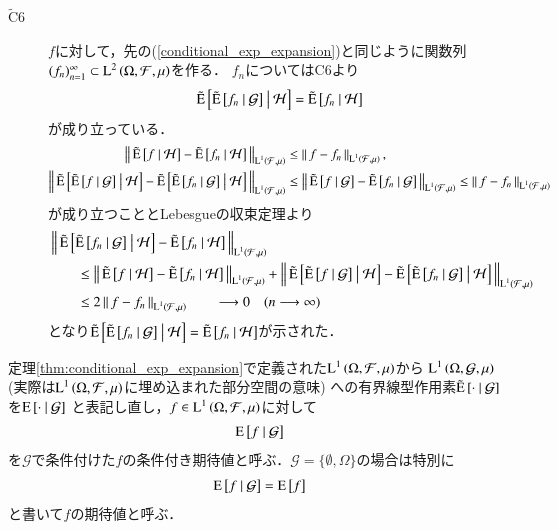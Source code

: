 \begin{prf}
\begin{description}
			\item[$\tilde{\mathrm{C}}$6]
				$f$に対して，先の(\ref{conditional_exp_expansion})と同じように関数列$(f_n)_{n=1}^{\infty} \subset \Lp{2}{\Omega,\mathcal{F},\mu}$を作る．
				$f_n$についてはC6より
				\begin{align}
					\tcexp{\tcexp{f_n}{\mathcal{G}}}{\mathcal{H}} = \tcexp{f_n}{\mathcal{H}}
				\end{align}
				が成り立っている．
				\begin{align}
					\Norm{ \tcexp{f}{\mathcal{H}} -  \tcexp{f_n}{\mathcal{H}}}{\Lp{1}{\mathcal{F},\mu}}
					&\leq \Norm{f -  f_n}{\Lp{1}{\mathcal{F},\mu}}, \\
					\Norm{ \tcexp{\tcexp{f}{\mathcal{G}}}{\mathcal{H}} -  \tcexp{\tcexp{f_n}{\mathcal{G}}}{\mathcal{H}}}{\Lp{1}{\mathcal{F},\mu}}
					&\leq \Norm{ \tcexp{f}{\mathcal{G}} -  \tcexp{f_n}{\mathcal{G}} }{\Lp{1}{\mathcal{F},\mu}}
					\leq \Norm{f -  f_n}{\Lp{1}{\mathcal{F},\mu}}
				\end{align}
				が成り立つこととLebesgueの収束定理より
				\begin{align}
					&\Norm{ \tcexp{\tcexp{f_n}{\mathcal{G}}}{\mathcal{H}} - \tcexp{f_n}{\mathcal{H}} }{\Lp{1}{\mathcal{F},\mu}} \\
					&\qquad\leq \Norm{ \tcexp{f}{\mathcal{H}} -  \tcexp{f_n}{\mathcal{H}}}{\Lp{1}{\mathcal{F},\mu}}
						+ \Norm{ \tcexp{\tcexp{f}{\mathcal{G}}}{\mathcal{H}} -  \tcexp{\tcexp{f_n}{\mathcal{G}}}{\mathcal{H}}}{\Lp{1}{\mathcal{F},\mu}} \\
					&\qquad \leq 2 \Norm{f -  f_n}{\Lp{1}{\mathcal{F},\mu}} \qquad \longrightarrow 0 \quad (n \longrightarrow \infty)
				\end{align}
				となり$\tcexp{\tcexp{f_n}{\mathcal{G}}}{\mathcal{H}} = \tcexp{f_n}{\mathcal{H}}$が示された．
		\end{description}
		\QED
	\end{prf}
	
	\begin{dfn}[条件付き期待値の再定義]
		定理\ref{thm:conditional_exp_expansion}で定義された$\Lp{1}{\Omega,\mathcal{F},\mu}$から
		$\Lp{1}{\Omega,\mathcal{G},\mu}\ $(実際は$\Lp{1}{\Omega,\mathcal{F},\mu}$に埋め込まれた部分空間の意味)
		への有界線型作用素$\tcexp{\cdot}{\mathcal{G}}$を$\cexp{\cdot}{\mathcal{G}}$
		と表記し直し，$f \in \Lp{1}{\Omega,\mathcal{F},\mu}$に対して
		\begin{align}
			\cexp{f}{\mathcal{G}}
		\end{align}
		を$\mathcal{G}$で条件付けた$f$の条件付き期待値と呼ぶ．$\mathcal{G} = \{\emptyset, \Omega\}$の場合は特別に
		\begin{align}
			\cexp{f}{\mathcal{G}} = \Exp{f}
		\end{align}
		と書いて$f$の期待値と呼ぶ．
	\end{dfn}